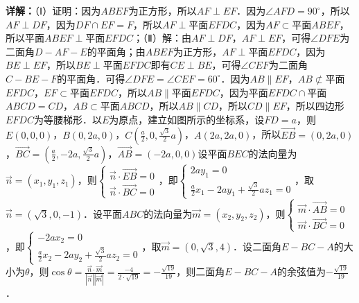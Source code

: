 \begin{question}[points=12]
\begin{solution}
\textbf{详解：}（Ⅰ）证明：因为$ABEF$为正方形，所以$AF\perp EF$．因为$\angle AFD=90^\circ$，所以$AF\perp DF$，因为$DF\cap EF=F$，所以$AF\perp$平面$EFDC$，因为$AF\subset$平面$ABEF$，所以平面$ABEF\perp$平面$EFDC$；（Ⅱ）解：由$AF\perp DF$，$AF\perp EF$，可得$\angle DFE$为二面角$D-AF-E$的平面角；由$ABEF$为正方形，$AF\perp$平面$EFDC$，因为$BE\perp EF$，所以$BE\perp$平面$EFDC$即有$CE\perp BE$，可得$\angle CEF$为二面角$C-BE-F$的平面角．可得$\angle DFE=\angle CEF=60^\circ$．因为$AB\parallel EF$，$AB\not\subset$平面$EFDC$，$EF\subset$平面$EFDC$，所以$AB\parallel$平面$EFDC$，因为平面$EFDC\cap$平面$ABCD=CD$，$AB\subset$平面$ABCD$，所以$AB\parallel CD$，所以$CD\parallel EF$，所以四边形$EFDC$为等腰梯形．以$E$为原点，建立如图所示的坐标系，设$FD=a$，则$E(0,0,0)$，$B(0,2a,0)$，$C(\frac{a}{2},0,\frac{\sqrt{3}}{2}a)$，$A(2a,2a,0)$，所以$\overrightarrow{EB}=(0,2a,0)$，$\overrightarrow{BC}=(\frac{a}{2},-2a,\frac{\sqrt{3}}{2}a)$，$\overrightarrow{AB}=(-2a,0,0)$设平面$BEC$的法向量为$\vec{n}=(x_1,y_1,z_1)$，则$\begin{cases}\vec{n}\cdot\overrightarrow{EB}=0\\\vec{n}\cdot\overrightarrow{BC}=0\end{cases}$，即$\begin{cases}2ay_1=0\\\frac{a}{2}x_1-2ay_1+\frac{\sqrt{3}}{2}az_1=0\end{cases}$，取$\vec{n}=(\sqrt{3},0,-1)$．设平面$ABC$的法向量为$\vec{m}=(x_2,y_2,z_2)$，则$\begin{cases}\vec{m}\cdot\overrightarrow{AB}=0\\\vec{m}\cdot\overrightarrow{BC}=0\end{cases}$，即$\begin{cases}-2ax_2=0\\\frac{a}{2}x_2-2ay_2+\frac{\sqrt{3}}{2}az_2=0\end{cases}$，取$\vec{m}=(0,\sqrt{3},4)$．设二面角$E-BC-A$的大小为$\theta$，则$\cos\theta=\frac{\vec{n}\cdot\vec{m}}{|\vec{n}||\vec{m}|}=\frac{-4}{2\cdot\sqrt{19}}=-\frac{\sqrt{19}}{19}$，则二面角$E-BC-A$的余弦值为$-\frac{\sqrt{19}}{19}$．
\end{solution}
\end{question}

